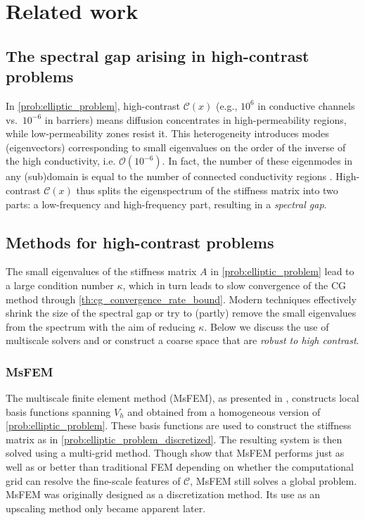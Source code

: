 \chapter{Related work}\label{ch:literature}
\section{The spectral gap arising in high-contrast problems}\label{sec:spectral_gap_darcy}
In \cref{prob:elliptic_problem}, high-contrast $\mathcal{C}(x)$ (e.g., $10^6$ in conductive channels vs.\ $ 10^{-6} $ in barriers) means diffusion concentrates in high-permeability regions, while low-permeability zones resist it. This heterogeneity introduces modes (eigenvectors) corresponding to small eigenvalues on the order of the inverse of the high conductivity, i.e. $\mathcal{O}(10^{-6})$. In fact, the number of these eigenmodes in any (sub)domain is equal to the number of connected conductivity regions \cite{ddp_for_multiscale_flows_in_high_contrast_media_Galvis2010}. High-contrast $\mathcal{C}(x)$ thus splits the eigenspectrum of the stiffness matrix into two parts: a low-frequency and high-frequency part, resulting in a \textit{spectral gap}.

\section{Methods for high-contrast problems}\label{sec:tailored_coarse_spaces}
The small eigenvalues of the stiffness matrix $A$ in \cref{prob:elliptic_problem} lead to a large condition number $\kappa$, which in turn leads to slow convergence of the CG method through \cref{th:cg_convergence_rate_bound}. Modern techniques effectively shrink the size of the spectral gap or try to (partly) remove the small eigenvalues from the spectrum with the aim of reducing $\kappa$. Below we discuss the use of multiscale solvers and or construct a coarse space that are \textit{robust to high contrast}.

\subsection{MsFEM}
The multiscale finite element method (MsFEM), as presented in \cite{og_msfem_Hou1997}, constructs local basis functions spanning $V_h$ and obtained from a homogeneous version of \cref{prob:elliptic_problem}. These basis functions are used to construct the stiffness matrix as in \cref{prob:elliptic_problem_discretized}. The resulting system is then solved using a multi-grid method. Though \citeauthor{og_msfem_Hou1997} show that MsFEM performs just as well as or better than traditional FEM depending on whether the computational grid can resolve the fine-scale features of $\mathcal{C}$, MsFEM still solves a global problem. MsFEM was originally designed as a discretization method. Its use as an upscaling method only became apparent later.

